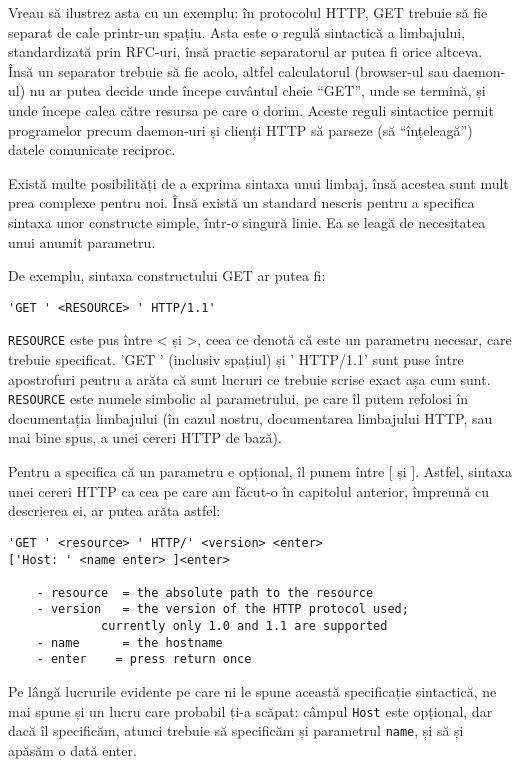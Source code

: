 Vreau să ilustrez asta cu un exemplu: în protocolul HTTP, GET trebuie
să fie separat de cale printr-un spațiu. Asta este o regulă sintactică
a limbajului, standardizată prin
RFC-uri,
însă practic separatorul ar putea fi orice altceva.
Însă un separator trebuie să fie acolo, altfel calculatorul (browser-ul
sau daemon-ul) nu ar putea decide unde începe cuvântul cheie ``GET'', unde
se termină, și unde începe calea către resursa pe care o dorim.
Aceste reguli sintactice
permit programelor precum daemon-uri și clienți HTTP
să parseze (să ``înțeleagă'') datele comunicate reciproc.

Există multe posibilități de a exprima sintaxa unui limbaj, însă acestea
sunt mult prea complexe pentru noi. Însă există un standard nescris
pentru a specifica sintaxa unor constructe simple, într-o singură linie.
Ea se leagă de necesitatea unui anumit parametru.

De exemplu, sintaxa constructului GET ar putea fi:\\
\begin{verbatim}'GET ' <RESOURCE> ' HTTP/1.1'\end{verbatim}
\texttt{RESOURCE} este pus între < și >, ceea ce denotă că
este un parametru necesar, care trebuie specificat.
'GET ' (inclusiv spațiul) și ' HTTP/1.1' sunt puse
între apostrofuri pentru a arăta că sunt lucruri
ce trebuie scrise exact așa cum sunt. \texttt{RESOURCE}
este numele simbolic al parametrului, pe care îl putem
refolosi în documentația limbajului (în cazul nostru,
documentarea limbajului HTTP, sau mai bine spus, a unei
cereri HTTP de bază).

Pentru a specifica că un parametru e opțional, îl punem între [ și ].
Astfel, sintaxa unei cereri HTTP ca cea pe care am făcut-o în capitolul
anterior, împreună cu descrierea ei, ar putea arăta astfel:
\begin{verbatim}
'GET ' <resource> ' HTTP/' <version> <enter>
['Host: ' <name enter> ]<enter>

	- resource	= the absolute path to the resource
	- version 	= the version of the HTTP protocol used;
             currently only 1.0 and 1.1 are supported
	- name	    = the hostname
	- enter    = press return once
\end{verbatim}

Pe lângă lucrurile evidente pe care ni le spune această specificație
sintactică, ne mai spune și un lucru care probabil ți-a scăpat:
câmpul \texttt{Host} este opțional, dar dacă îl specificăm, atunci
trebuie să specificăm și parametrul \texttt{name}, și să și apăsăm o dată enter.

